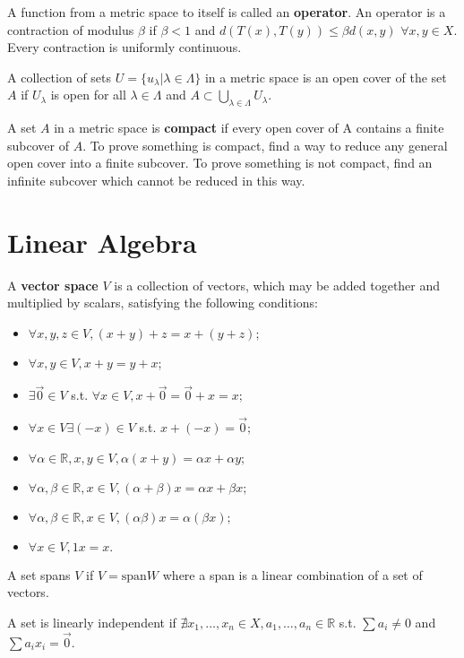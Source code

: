 \documentclass[11pt]{article} %
\begin{document}
A function from a metric space to itself is called an \textbf{operator}. An operator is a contraction of modulus $\beta$ if $\beta < 1$ and $d(T(x),T(y)) \leq \beta d(x,y)$ $\forall x,y \in X.$ Every contraction is uniformly continuous.

A collection of sets $U = \{u_{\lambda}|\lambda \in \Lambda \}$ in a metric space is an open cover of the set $A$ if $U_{\lambda}$ is open for all $\lambda \in \Lambda$ and $A \subset \bigcup_{\lambda \in \Lambda} U_{\lambda}.$

A set $A$ in a metric space is \textbf{compact} if every open cover of A contains a finite subcover of $A$. To prove something is compact, find a way to reduce any general open cover into a finite subcover. To prove something is not compact, find an infinite subcover which cannot be reduced in this way.

\section{Linear Algebra}

A \textbf{vector space} $V$ is a collection of vectors, which may be added together and multiplied by scalars, satisfying the following conditions:
\begin{itemize}
\item $\forall x,y,z \in V, (x+y)+z = x+(y+z)$;
\item $\forall x,y \in V, x+y = y+x$;
\item $\exists \vec{0} \in V$ s.t. $\forall x \in V, x + \vec{0} = \vec{0}+x = x;$
\item $\forall x \in V \exists (-x) \in V$ s.t. $x + (-x) = \vec{0};$
\item $\forall \alpha \in \mathbb{R}, x,y \in V, \alpha (x + y) = \alpha x + \alpha y;$
\item $\forall \alpha, \beta \in \mathbb{R}, x \in V, (\alpha + \beta)x = \alpha x + \beta x;$
\item $\forall \alpha, \beta \in \mathbb{R}, x \in V, (\alpha \beta)x = \alpha  (\beta x);$
\item $\forall x \in V, 1 x = x.$
\end{itemize}

A set spans $V$ if $V = \text{span}W$ where a span is a linear combination of a set of vectors.

A set is linearly independent if $\nexists x_1, \dots, x_n \in X, a_1,\dots, a_n \in \mathbb{R}$ s.t. $\sum a_i  \neq 0$ and $\sum a_i x_i = \vec{0}.$
\end{document}

